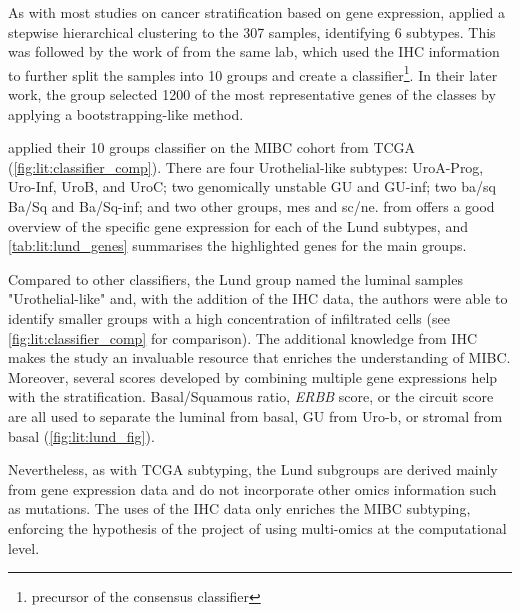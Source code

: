 As with most studies on cancer stratification based on gene expression, \citet{Sjodahl2017-xr} applied a stepwise hierarchical clustering to the 307 samples, identifying 6 subtypes. This was followed by the work of \citet{Marzouka2018-ge} from the same lab, which used the IHC information to further split the samples into 10 groups and create a classifier\footnote{precursor of the consensus classifier}. In their later work, the group selected 1200 of the most representative genes of the classes by applying a bootstrapping-like method.

\citet{Marzouka2018-ge} applied their 10 groups classifier on the MIBC cohort from TCGA (\cref{fig:lit:classifier_comp}). There are four Urothelial-like subtypes: UroA-Prog, Uro-Inf, UroB, and UroC; two genomically unstable GU and GU-inf; two \acrfull{ba/sq}  Ba/Sq and Ba/Sq-inf; and two other groups, \acrfull{mes} and \acrfull{sc/ne}.  from \citet{Marzouka2018-ge} offers a good overview of the specific gene expression for each of the Lund subtypes, and \cref{tab:lit:lund_genes} summarises the highlighted genes for the main groups.

Compared to other classifiers, the Lund group named the luminal samples "Urothelial-like" and, with the addition of the IHC data, the authors were able to identify smaller groups with a high concentration of infiltrated cells (see \cref{fig:lit:classifier_comp} for comparison). The additional knowledge from IHC makes the study an invaluable resource that enriches the understanding of MIBC. Moreover, several scores developed by combining multiple gene expressions help with the stratification. Basal/Squamous ratio, \textit{ERBB} score, or the circuit score are all used to separate the luminal from basal, GU from Uro-b, or stromal from basal (\cref{fig:lit:lund_fig}). 

Nevertheless, as with TCGA subtyping, the Lund subgroups are derived mainly from gene expression data and do not incorporate other omics information such as mutations. The uses of the IHC data only enriches the MIBC subtyping, enforcing the hypothesis of the project of using multi-omics at the computational level.


